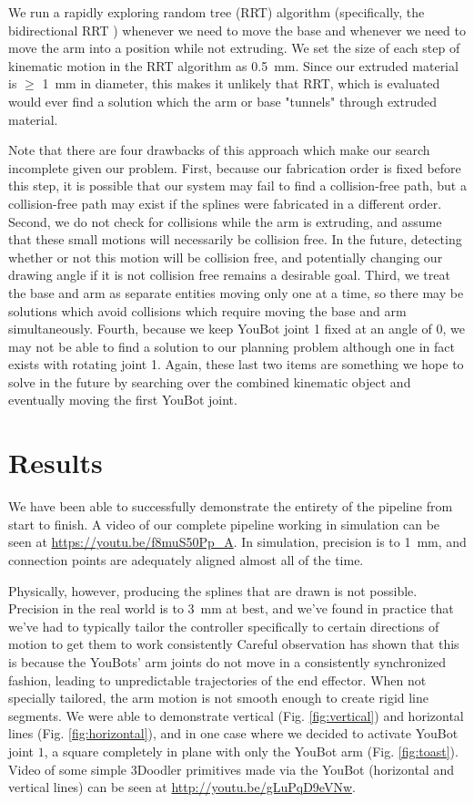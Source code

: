 \documentclass[conference]{acmsiggraph}
\begin{document}
We run a rapidly exploring random tree (RRT) \cite{RRT} algorithm (specifically, the bidirectional RRT \cite{biRRT}) whenever we need to move the base and whenever we need to move the arm into a position while not extruding.  We set the size of each step of kinematic motion in the RRT algorithm as 0.5~mm.  Since our extruded material is $\geq$ 1~mm in diameter, this makes it unlikely that RRT, which is evaluated would ever find a solution which the arm or base "tunnels" through extruded material.

Note that there are four drawbacks of this approach which make our search incomplete given our problem. First, because our fabrication order is fixed before this step, it is possible that our system may fail to find a collision-free path, but a collision-free path may exist if the splines were fabricated in a different order.  Second, we do not check for collisions while the arm is extruding, and assume that these small motions will necessarily be collision free.  In the future, detecting whether or not this motion will be collision free, and potentially changing our drawing angle if it is not collision free remains a desirable goal.  Third, we treat the base and arm as separate entities moving only one at a time, so there may be solutions which avoid collisions which require moving the base and arm simultaneously.  Fourth, because we keep YouBot joint 1 fixed at an angle of $0$, we may not be able to find a solution to our planning problem although one in fact exists with rotating joint 1.  Again, these last two items are something we hope to solve in the future by searching over the combined kinematic object and eventually moving the first YouBot joint.

\section{Results}

We have been able to successfully demonstrate the entirety of the pipeline from start to finish.  A video of our complete pipeline working in simulation can be seen at \url{https://youtu.be/f8muS50Pp_A}.  In simulation, precision is to 1~mm, and connection points are adequately aligned almost all of the time.

Physically, however, producing the splines that are drawn is not possible.  Precision in the real world is to 3~mm at best, and we've found in practice that we've had to typically tailor the controller specifically to certain directions of motion to get them to work consistently  Careful observation has shown that this is because the YouBots' arm joints do not move in a consistently synchronized fashion, leading to unpredictable trajectories of the end effector.  When not specially tailored, the arm motion is not smooth enough to create rigid line segments.  We were able to demonstrate vertical (Fig. \ref{fig:vertical}) and horizontal lines (Fig. \ref{fig:horizontal}), and in one case where we decided to activate YouBot joint $1$, a square completely in plane with only the YouBot arm (Fig. \ref{fig:toast}).  Video of some simple 3Doodler primitives made via the YouBot (horizontal and vertical lines) can be seen at \url{http://youtu.be/gLuPqD9eVNw}.
\end{document}
